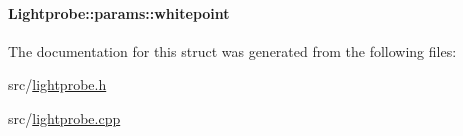 \hypertarget{structLightprobe_1_1params_a70ece8306fa1403868ec00f9eb5a1127}{
\paragraph[{whitepoint}]{ {\bf \-Lightprobe\-::params\-::whitepoint}}}\label{structLightprobe_1_1params_a70ece8306fa1403868ec00f9eb5a1127}


\-The documentation for this struct was generated from the following files\-:\begin{DoxyCompactItemize}
\item 
src/\hyperlink{lightprobe_8h}{lightprobe.\-h}\item 
src/\hyperlink{lightprobe_8cpp}{lightprobe.\-cpp}\end{DoxyCompactItemize}
